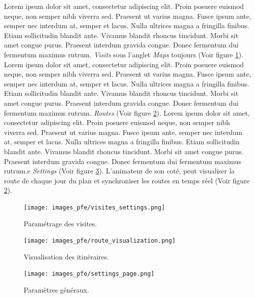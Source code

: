 Lorem ipsum dolor sit amet, consectetur adipiscing elit. Proin posuere euismod neque, non semper nibh viverra sed. Praesent ut varius magna. Fusce ipsum ante, semper nec interdum at, semper et lacus. Nulla ultrices magna a fringilla finibus. Etiam sollicitudin blandit ante. Vivamus blandit rhoncus tincidunt. Morbi sit amet congue purus. Praesent interdum gravida congue. Donec fermentum dui fermentum maximus rutrum. \textit{Visits} sous l'anglet \textit{Maps} toujours (Voir figure \ref{fig:routes-settings-page}). Lorem ipsum dolor sit amet, consectetur adipiscing elit. Proin posuere euismod neque, non semper nibh viverra sed. Praesent ut varius magna. Fusce ipsum ante, semper nec interdum at, semper et lacus. Nulla ultrices magna a fringilla finibus. Etiam sollicitudin blandit ante. Vivamus blandit rhoncus tincidunt. Morbi sit amet congue purus. Praesent interdum gravida congue. Donec fermentum dui fermentum maximus rutrum. \textit{Routes} (Voir figure \ref{fig:routes-visualization-page}). Lorem ipsum dolor sit amet, consectetur adipiscing elit. Proin posuere euismod neque, non semper nibh viverra sed. Praesent ut varius magna. Fusce ipsum ante, semper nec interdum at, semper et lacus. Nulla ultrices magna a fringilla finibus. Etiam sollicitudin blandit ante. Vivamus blandit rhoncus tincidunt. Morbi sit amet congue purus. Praesent interdum gravida congue. Donec fermentum dui fermentum maximus rutrum.e \textit{Settings} (Voir figure \ref{fig:general-settings-page}). L'animateur de son coté, peut visualiser la route de chaque jour du plan et synchroniser les routes en temps réel (Voir figure \ref{fig:routes-visualization-page}).

\begin{figure}[hbt!]
  \centering
  \texttt{[image: images\_pfe/visites\_settings.png]}
  \caption{Paramétrage des visites.}
  \label{fig:routes-settings-page}
\end{figure}
\FloatBarrier

\begin{figure}[hbt!]
  \centering
  \texttt{[image: images\_pfe/route\_visualization.png]}
  \caption{Visualisation des itinéraires.}
  \label{fig:routes-visualization-page}
\end{figure}
\FloatBarrier

\begin{figure}[hbt!]
  \centering
  \texttt{[image: images\_pfe/settings\_page.png]}
  \caption{Paramètres généraux.}
  \label{fig:general-settings-page}
\end{figure}
\FloatBarrier

